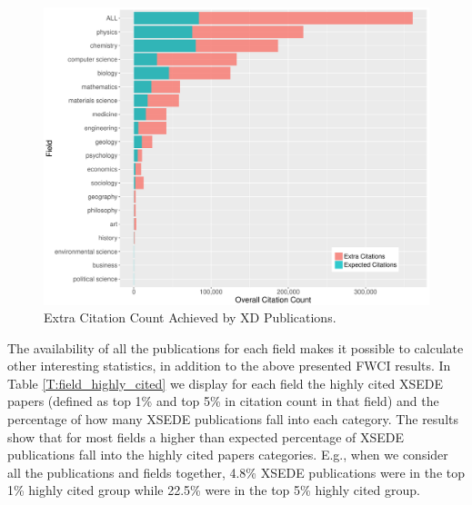 \documentclass{sig-alternate}
\begin{document}
\begin{figure}[htb!]
    \includegraphics[width=0.95\columnwidth]{images/FWCI_CC.pdf}
    \caption{Extra Citation Count Achieved by XD Publications.}
    \label{F:FWCI_CC}
\end{figure}

The availability of all the publications for each field makes it
possible to calculate other interesting statistics, in addition to the
above presented FWCI results. In Table \ref{T:field_highly_cited} we
display for each field the highly cited XSEDE papers (defined as top
1\% and top 5\% in citation count in that field) and the percentage of
how many XSEDE publications fall into each category. The results show
that for most fields a higher than expected percentage of XSEDE
publications fall into the highly cited papers categories. E.g., when
we consider all the publications and fields together, 4.8\% XSEDE
publications were in the top 1\% highly cited group while 22.5\% were
in the top 5\% highly cited group.
\end{document}
